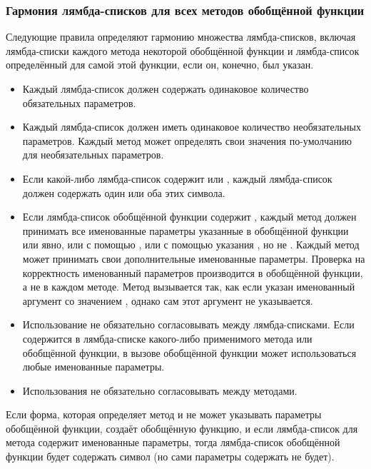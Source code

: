 \subsubsection{Гармония лямбда-списков для всех методов обобщённой функции}
\label{Congruent-Lambda-Lists-for-All-Methods-of-a-Generic-Function-SECTION}

Следующие правила определяют гармонию множества лямбда-списков, включая
лямбда-списки каждого метода некоторой обобщённой функции и лямбда-список
определённый для самой этой функции, если он, конечно, был указан.
\begin{itemize}

\item Каждый лямбда-список должен содержать одинаковое количество обязательных
  параметров.

\item Каждый лямбда-список должен иметь одинаковое количество необязательных
  параметров. Каждый метод может определять свои значения по-умолчанию для
  необязательных параметров.

\item Если какой-либо лямбда-список содержит  или , каждый
  лямбда-список должен содержать один или оба этих символа.

\item Если лямбда-список обобщённой функции содержит , каждый метод
  должен принимать все именованные параметры указанные в обобщённой функции или
  явно, или с помощью , или с помощью указания
  , но не .
  Каждый метод может принимать свои дополнительные именованные параметры.
  Проверка на корректность именованный параметров производится в обобщённой
  функции, а не в каждом методе. Метод вызывается так, как если указан
  именованный аргумент  со значением , однако сам
  этот аргумент не указывается.

\item Использование  не обязательно согласовывать между
  лямбда-списками. Если  содержится в лямбда-списке
  какого-либо применимого метода или обобщённой функции, в вызове обобщённой
  функции может использоваться любые именованные параметры.

\item Использования  не обязательно согласовывать между методами.
\end{itemize}

Если форма, которая определяет метод и не может указывать параметры обобщённой
функции, создаёт обобщённую функцию, и если лямбда-список для метода содержит
именованные параметры, тогда лямбда-список обобщённой функции будет содержать
символ  (но сами параметры содержать не будет).

